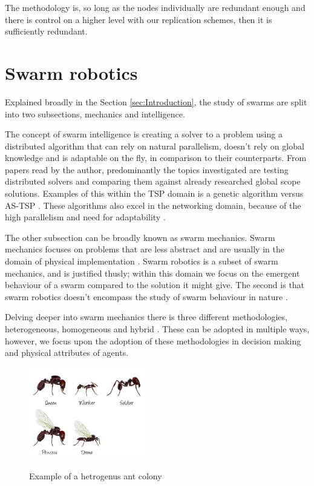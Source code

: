 \documentclass{UoYCSproject}
\begin{document}
The methodology is, so long as the nodes individually are redundant enough and there is control on a higher level with our replication schemes, then it is sufficiently redundant.



\section{Swarm robotics}
\label{sec:Robotics}

Explained broadly in the Section \ref{sec:Introduction}, the study of swarms are split into two subsections, mechanics and intelligence.

The concept of swarm intelligence is creating a solver to a problem using a distributed algorithm that can rely on natural parallelism, doesn't rely on global knowledge and is adaptable on the fly, in comparison to their counterparts.
From papers read by the author, predominantly the topics investigated are testing distributed solvers and comparing them against already researched global scope solutions.
Examples of this within the TSP domain is a genetic algorithm versus AS-TSP \cite{Swarm intellegiegence}.
These algorithms also excel in the networking domain, because of the high parallelism and need for adaptability \cite{Swarm intellegiegence}.

The other subsection can be broadly known as swarm mechanics.
Swarm mechanics focuses on problems that are less abstract and are usually in the domain of physical implementation \cite{Cognitive maps mine detection, Probabalitic automata foraging robots}.
Swarm robotics is a subset of swarm mechanics, and is justified thusly; within this domain we focus on the emergent behaviour of a swarm compared to the solution it might give.
The second is that swarm robotics doesn’t encompass the study of swarm behaviour in nature \cite{Swarm intellegiegence, Ant communication}.

Delving deeper into swarm mechanics there is three different methodologies, heterogeneous, homogeneous and hybrid \cite{Swarm robotics reviewed}.
These can be adopted in multiple ways, however, we focus upon the adoption of these methodologies in decision making and physical attributes of agents.

\begin{figure}[htb]
\begin{center}
\label{fig:anthero}
\includegraphics[height=4cm]{"./ExplanationImgs/AntHetro.png"}
\end{center}
\caption{Example of a hetrogenus ant colony}
\end{figure}
\end{document}
